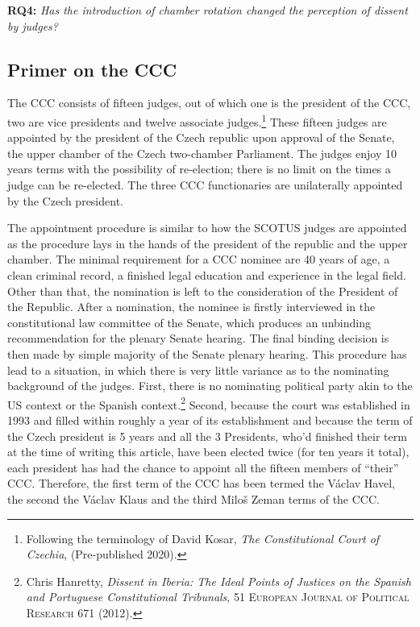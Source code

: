 \documentclass[
  11pt,
]{article}
\begin{document}
\textbf{RQ4:} \emph{Has the introduction of chamber rotation changed the perception of dissent by judges?}

\subsection{Primer on the CCC}\label{primer}

The CCC consists of fifteen judges, out of which one is the president of the CCC, two are vice presidents and twelve associate judges.\footnote{Following the terminology of David Kosar, \emph{The {Constitutional Court} of {Czechia}}, (Pre-published 2020).} These fifteen judges are appointed by the president of the Czech republic upon approval of the Senate, the upper chamber of the Czech two-chamber Parliament. The judges enjoy 10 years terms with the possibility of re-election; there is no limit on the times a judge can be re-elected. The three CCC functionaries are unilaterally appointed by the Czech president.

The appointment procedure is similar to how the SCOTUS judges are appointed as the procedure lays in the hands of the president of the republic and the upper chamber. The minimal requirement for a CCC nominee are 40 years of age, a clean criminal record, a finished legal education and experience in the legal field. Other than that, the nomination is left to the consideration of the President of the Republic. After a nomination, the nominee is firstly interviewed in the constitutional law committee of the Senate, which produces an unbinding recommendation for the plenary Senate hearing. The final binding decision is then made by simple majority of the Senate plenary hearing. This procedure has lead to a situation, in which there is very little variance as to the nominating background of the judges. First, there is no nominating political party akin to the US context or the Spanish context.\footnote{Chris Hanretty, \emph{Dissent in {Iberia}: {The} Ideal Points of Justices on the {Spanish} and {Portuguese Constitutional Tribunals}}, 51 \textsc{European Journal of Political Research} 671 (2012).} Second, because the court was established in 1993 and filled within roughly a year of its establishment and because the term of the Czech president is 5 years and all the 3 Presidents, who'd finished their term at the time of writing this article, have been elected twice (for ten years it total), each president has had the chance to appoint all the fifteen members of ``their'' CCC. Therefore, the first term of the CCC has been termed the Václav Havel, the second the Václav Klaus and the third Miloš Zeman terms of the CCC.
\end{document}
